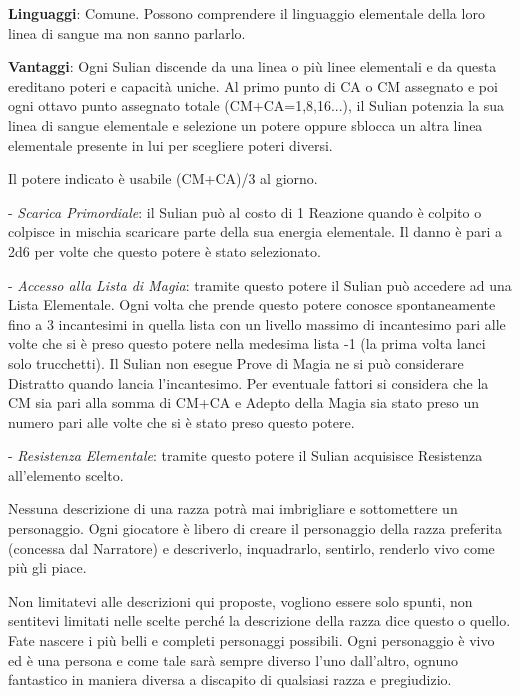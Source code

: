 \begin{multicols}{2}
\textbf{Linguaggi}: Comune. Possono comprendere il linguaggio elementale della loro linea di sangue ma non sanno parlarlo.

\textbf{Vantaggi}: Ogni Sulian discende da una linea o più linee elementali e da questa ereditano poteri e capacità uniche. Al primo punto di CA o CM assegnato e poi ogni ottavo punto assegnato totale (CM+CA=1,8,16...), il Sulian potenzia la sua linea di sangue elementale e selezione un potere oppure sblocca un altra linea elementale presente in lui per scegliere poteri diversi.

Il potere indicato è usabile (CM+CA)/3 al giorno.

- \emph{Scarica Primordiale}: il Sulian può al costo di 1 Reazione quando è colpito o colpisce in mischia scaricare parte della sua energia elementale. Il danno è pari a 2d6 per volte che questo potere è stato selezionato.

- \emph{Accesso alla Lista di Magia}: tramite questo potere il Sulian può accedere ad una Lista Elementale. Ogni volta che prende questo potere conosce spontaneamente fino a 3 incantesimi in quella lista con un livello massimo di incantesimo pari alle volte che si è preso questo potere nella medesima lista -1 (la prima volta lanci solo trucchetti).
Il Sulian non esegue Prove di Magia ne si può considerare Distratto quando lancia l'incantesimo. Per eventuale fattori si considera che la CM sia pari alla somma di CM+CA e Adepto della Magia sia stato preso un numero pari alle volte che si è stato preso questo potere.

- \emph{Resistenza Elementale}: tramite questo potere il Sulian acquisisce Resistenza all'elemento scelto.

\end{multicols}



\begin{giocatore}
Nessuna descrizione di una razza potrà mai imbrigliare e sottomettere un personaggio. Ogni giocatore è libero di creare il personaggio della razza preferita (concessa dal Narratore) e descriverlo, inquadrarlo, sentirlo, renderlo vivo come più gli piace.

Non limitatevi alle descrizioni qui proposte, vogliono essere solo spunti, non sentitevi limitati nelle scelte perché la descrizione della razza dice questo o quello.
Fate nascere i più belli e completi personaggi possibili. Ogni personaggio è vivo ed è una persona e come tale sarà sempre diverso l'uno dall'altro, ognuno fantastico in maniera diversa a discapito di qualsiasi razza e pregiudizio.
\end{giocatore}

